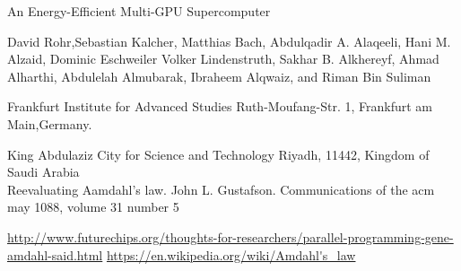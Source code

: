 \documentclass[a4paper]{article}
\begin{document}
An Energy-Efficient Multi-GPU Supercomputer

David Rohr,Sebastian Kalcher, Matthias Bach, Abdulqadir A. Alaqeeli, Hani M. Alzaid, Dominic Eschweiler
Volker Lindenstruth, Sakhar B. Alkhereyf, Ahmad Alharthi, Abdulelah Almubarak, Ibraheem Alqwaiz, and Riman Bin Suliman 

Frankfurt Institute for Advanced Studies Ruth-Moufang-Str. 1, Frankfurt am Main,Germany.

King Abdulaziz City for Science and Technology Riyadh, 11442, Kingdom of Saudi Arabia
\\
Reevaluating Aamdahl’s law. John L. Gustafson. Communications of the acm may 1088, volume 31 number 5


\url{http://www.futurechips.org/thoughts-for-researchers/parallel-programming-gene-amdahl-said.html}
\url{https://en.wikipedia.org/wiki/Amdahl's_law}
\end{document}
